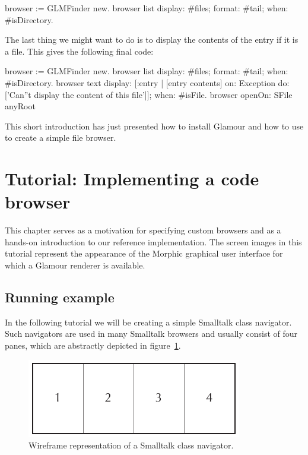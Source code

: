 \documentclass[a4paper,10pt,twoside]{book}
\begin{document}
\begin{code}{}
browser := GLMFinder new.
browser list
  display: #files;
  format: #tail;
  when: #isDirectory.
\end{code}

The last thing we might want to do is to display the contents of the
entry if it is a file. This gives the following final code:

\begin{code}{}
browser := GLMFinder new.
browser list
  display: #files;
  format: #tail;
  when: #isDirectory.
browser text
	display: [:entry | [entry contents]
                                   on: Exception
                                   do: ['Can''t display the content of this file']];
	when: #isFile.
browser openOn: SFile anyRoot
\end{code}


This short introduction has just presented how to install Glamour and
how to use to create a simple file browser.

\section{Tutorial: Implementing a code browser}

This chapter serves as a motivation for specifying custom browsers and
as a hands-on introduction to our reference implementation. The screen
images in this tutorial represent the appearance of the Morphic
graphical user interface for which a Glamour renderer is available.

\subsection{Running example}
\label{sec:tutorial/getting_started}

In the following tutorial we will be creating a simple Smalltalk class
navigator. Such navigators are used in many Smalltalk browsers and
usually consist of four panes, which are abstractly depicted in
figure~\ref{fig:classnavigator_wireframe}.

\begin{figure}[htbp]
\centerline{\includegraphics[width=\linewidth]{classnavigator_wireframe.pdf}}
\caption{Wireframe representation of a Smalltalk class navigator.}
\label{fig:classnavigator_wireframe}
\end{figure}
\end{document}

